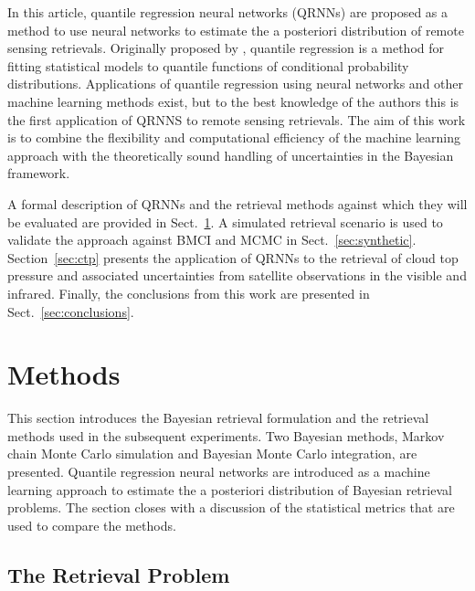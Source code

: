 \documentclass[journal abbreviation, manuscript]{copernicus}
\begin{document}
In this article, quantile regression neural networks (QRNNs) are proposed as a
method to use neural networks to estimate the a posteriori distribution of
remote sensing retrievals. Originally proposed by \citet{koenker_bassett},
quantile regression is a method for fitting statistical models to quantile
functions of conditional probability distributions. Applications of quantile
regression using neural networks \citep{cannon} and other machine learning
methods \citep{meinshausen} exist, but to the best knowledge of the authors this
is the first application of QRNNS to remote sensing retrievals. The aim of this
work is to combine the flexibility and computational efficiency of the machine
learning approach with the theoretically sound handling of uncertainties in the
Bayesian framework.

A formal description of QRNNs and the retrieval methods against which they will
be evaluated are provided in Sect.~\ref{sec:methods}. A simulated retrieval scenario is used to validate
the approach against BMCI and MCMC in Sect.~\ref{sec:synthetic}. Section~\ref{sec:ctp} presents the
application of QRNNs to the retrieval of cloud top pressure and associated
uncertainties from satellite observations in the visible and infrared. Finally,
the conclusions from this work are presented in Sect.~\ref{sec:conclusions}.

\section{Methods}
\label{sec:methods}

This section introduces the Bayesian retrieval formulation and the retrieval
methods used in the subsequent experiments. Two Bayesian methods, Markov chain
Monte Carlo simulation and Bayesian Monte Carlo integration, are presented.
Quantile regression neural networks are introduced as a machine learning
approach to estimate the a posteriori distribution of Bayesian retrieval
problems. The section closes with a discussion of the statistical metrics that
are used to compare the methods.

\subsection{The Retrieval Problem}
\end{document}
